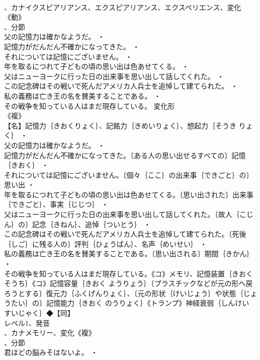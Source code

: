 \documentclass[8pt]{extreport}
\begin{document}
\begin{CJK}{UTF8}{min}
\\	、カナイクスピアリアンス、エクスピアリアンス、エクスペリエンス、変化《動》
\\	、分節
\\	父の記憶力は確かなようだ。 ・
\\	記憶力がだんだん不確かになってきた。 ・
\\	それについては記憶にございません。 ・
\\	年を取るにつれて子どもの頃の思い出は色あせてくる。 ・
\\	父はニューヨークに行った日の出来事を思い出して話してくれた。 ・
\\	この記念碑はその戦いで死んだアメリカ人兵士を追悼して建てられた。 ・
\\	私の義務は亡き王の名を賛美することである。 ・
\\	その戦争を知っている人はまだ現存している。	変化形 
\\	《複》
\\	【名】記憶力｛きおくりょく｝、記銘力｛きめいりょく｝、想起力｛そうき りょく｝ ・
\\	父の記憶力は確かなようだ。 ・
\\	記憶力がだんだん不確かになってきた。〔ある人の思い出せるすべての〕記憶｛きおく｝ ・
\\	それについては記憶にございません。〔個々｛ここ｝の出来事｛できごと｝の〕思い出 ・
\\	年を取るにつれて子どもの頃の思い出は色あせてくる。〔思い出された〕出来事｛できごと｝、事実｛じじつ｝ ・
\\	父はニューヨークに行った日の出来事を思い出して話してくれた。〔故人｛こじん｝の〕記念｛きねん｝、追悼｛ついとう｝ ・
\\	この記念碑はその戦いで死んだアメリカ人兵士を追悼して建てられた。〔死後｛しご｝に残る人の〕評判｛ひょうばん｝、名声｛めいせい｝ ・
\\	私の義務は亡き王の名を賛美することである。〔思い出される〕期間｛きかん｝ ・
\\	その戦争を知っている人はまだ現存している。《コ》メモリ、記憶装置｛きおく そうち｝《コ》記憶容量｛きおく ようりょう｝〔プラスチックなどが元の形へ戻ろうとする〕復元力｛ふくげんりょく｝、〔元の形状｛けいじょう｝や状態｛じょうたい｝の〕記憶能力｛きおく のうりょく｝《トランプ》神経衰弱｛しんけい すいじゃく｝◆【同】
\\	レベル1、発音
\\	、カナメモリー、変化《複》
\\	、分節
\\	君ほどの脳みそはないよ。 ・

\end{CJK}
\end{document}
